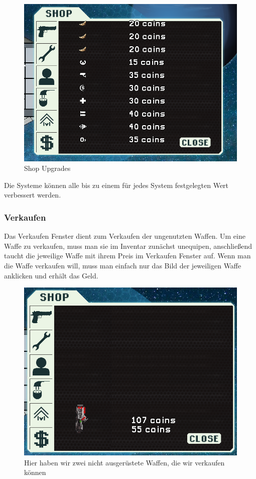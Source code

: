 \documentclass[fontsize=12pt,paper=a4,twoside]{scrartcl}
\begin{document}
\begin{figure}[H]
\centering
\includegraphics[width=1\linewidth]{DasSpiel/Shop/upgrades.png}
\caption{Shop Upgrades}
\end{figure}

Die Systeme können alle bis zu einem für jedes System festgelegten Wert verbessert werden. 

\subsubsection{Verkaufen}

Das Verkaufen Fenster dient zum Verkaufen der ungenutzten Waffen. Um eine Waffe zu verkaufen, muss man sie im Inventar zunächst unequipen, anschließend taucht die jeweilige Waffe mit ihrem Preis im Verkaufen Fenster auf. Wenn man die Waffe verkaufen will, muss man einfach nur das Bild der jeweiligen Waffe anklicken und erhält das Geld. 

\begin{figure}[H]
\centering
\includegraphics[width=1\linewidth]{DasSpiel/Shop/sell.png}
\caption{Hier haben wir zwei nicht ausgerüstete Waffen, die wir verkaufen können}
\end{figure}
\end{document}
